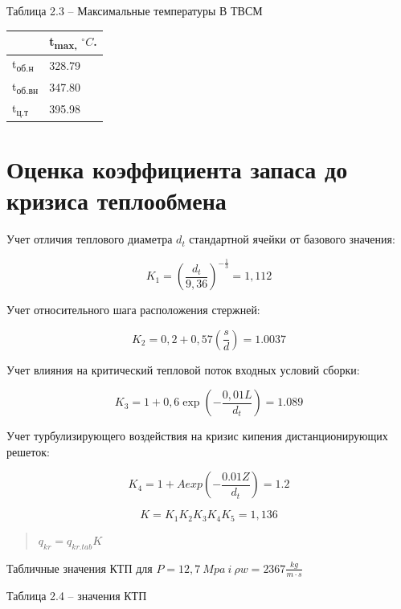 Таблица 2.3 -- Максимальные температуры В ТВСМ

\begin{longtable}[]{@{}|l|l|@{}} 
\toprule
& t\textsubscript{max,} $^\circ C$.\tabularnewline
\midrule
\endhead
t\textsubscript{об.н} & 328.79\tabularnewline
t\textsubscript{об.вн} & 347.80\tabularnewline
t\textsubscript{ц.т} & 395.98\tabularnewline
\bottomrule
\end{longtable}

\clearpage

\section{Оценка коэффициента запаса до кризиса теплообмена}

Учет отличия теплового диаметра \(d_{t}\) стандартной ячейки от базового
значения:

\begin{equation}
K_{1} = \left( \frac{d_{t}}{9,36} \right)^{- \frac{1}{3}} = 1,112
\end{equation}


Учет относительного шага расположения стержней:

\begin{equation}
K_{2} = 0,2 + 0,57\left( \frac{s}{d} \right) = 1.0037
\end{equation}


Учет влияния на критический тепловой поток входных условий сборки:

\begin{equation}
K_{3} = 1 + 0,6\exp{\left( - \frac{0,01L}{d_{t}} \right) = 1.089}
\end{equation}


Учет турбулизирующего воздействия на кризис кипения дистанционирующих
решеток:

\begin{equation}
K_{4} = 1 + Aexp\left( - \frac{0.01Z}{d_{t}} \right) = 1.2
\end{equation}

\begin{equation}
K = K_{1}K_{2}K_{3}K_{4}K_{5} = 1,136
\end{equation}

\begin{quote}
\(q_{kr} = q_{kr.tab}K\)
\end{quote}


Табличные значения КТП для
\(P = 12,7\ Mpa\ i\ \rho w = 2367\frac{kg}{m \cdot s}\)

Таблица 2.4 -- значения КТП

